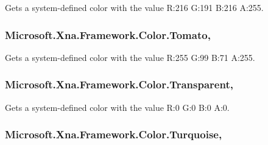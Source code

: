Gets a system-\/defined color with the value R\+:216 G\+:191 B\+:216 A\+:255.

\hypertarget{struct_microsoft_1_1_xna_1_1_framework_1_1_color_a28ec498f89063532f36aa506d47cdb56}{}
\subsubsection[{Tomato}]{ Microsoft.\+Xna.\+Framework.\+Color.\+Tomato\hspace{0.3cm}{\ttfamily [static]}, {\ttfamily [get]}}\label{struct_microsoft_1_1_xna_1_1_framework_1_1_color_a28ec498f89063532f36aa506d47cdb56}


Gets a system-\/defined color with the value R\+:255 G\+:99 B\+:71 A\+:255.

\hypertarget{struct_microsoft_1_1_xna_1_1_framework_1_1_color_ac10dfa68094a7efdd13d85de53669233}{}
\subsubsection[{Transparent}]{ Microsoft.\+Xna.\+Framework.\+Color.\+Transparent\hspace{0.3cm}{\ttfamily [static]}, {\ttfamily [get]}}\label{struct_microsoft_1_1_xna_1_1_framework_1_1_color_ac10dfa68094a7efdd13d85de53669233}


Gets a system-\/defined color with the value R\+:0 G\+:0 B\+:0 A\+:0.

\hypertarget{struct_microsoft_1_1_xna_1_1_framework_1_1_color_a7e855c7c34c4e0f756c70cf000e3738e}{}
\subsubsection[{Turquoise}]{ Microsoft.\+Xna.\+Framework.\+Color.\+Turquoise\hspace{0.3cm}{\ttfamily [static]}, {\ttfamily [get]}}\label{struct_microsoft_1_1_xna_1_1_framework_1_1_color_a7e855c7c34c4e0f756c70cf000e3738e}


